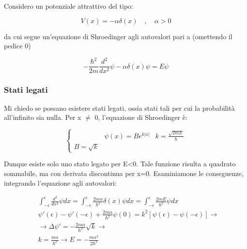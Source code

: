 \documentclass{article}
\begin{document}
Considero un potenziale attrattivo del tipo:

\begin{equation}
    V(x)= -\alpha \delta(x) \quad , \quad \alpha>0
\end{equation}

da cui segue un'equazione di Shroedinger agli autovalori pari a (omettendo il pedice 0)

\begin{equation}
    -\frac{\hbar^2}{2m}\frac{d^2}{dx^2}\psi-\alpha \delta(x)\psi=E\psi
\end{equation}

\subsubsection[short]{Stati legati}
Mi chiedo se possano esistere stati legati, ossia stati tali per cui la probabilità all'infinito sia nulla.
Per x $\neq$ 0, l'equazione di Shroedinger è:

\begin{equation}
    \left\{
    \begin{aligned}
         & \psi(x)=Be^{k|x|}
         & k=\frac{\sqrt{2mE}}{\hbar}
        \\ B= \sqrt{k}
    \end{aligned}
    \right.
\end{equation}

Dunque esiste solo uno stato legato per E<0.
Tale funzione risulta a quadrato sommabile, ma con derivata discontinua per x=0. Esaminiamone le conseguenze, integrando
l'equazione agli autovalori:

\begin{equation}
    \begin{aligned}
         & \int_{-\epsilon}^{\epsilon} \frac{d^2}{dx^2} \psi dx = \int_{-\epsilon}^{\epsilon}\frac{2m\alpha}{\hbar^2}\delta(x)\psi dx= \int_{-\epsilon}^{\epsilon} \frac{2mE}{\hbar^2}\psi dx \\
         & \psi'(\epsilon)-\psi'(-\epsilon)+\frac{2m\alpha}{\hbar^2}\psi(0)=k^2[\psi(\epsilon)- \psi(-\epsilon)] \rightarrow                                                                  \\
         & \rightarrow \Delta \psi'= -\frac{2m\alpha}{\hbar^2}\sqrt{k} \rightarrow                                                                                                            \\
         & k= \frac{m\alpha}{\hbar^2} \rightarrow E=-\frac{m\alpha^2}{2\hbar^2}
    \end{aligned}
\end{equation}
\end{document}
